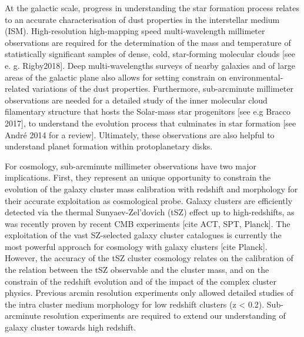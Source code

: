 
At the galactic scale, progress in understanding the star formation
process relates to an accurate characterisation of dust properties in
the interstellar medium (ISM). High-resolution high-mapping speed
multi-wavelength millimeter observations are required for the
determination of the mass and temperature of statistically significant
samples of dense, cold, star-forming molecular clouds
[see e. g. Rigby2018].
Deep multi-wavelengths surveys of nearby galaxies and of large areas
of the galactic plane also allows for setting constrain on
environmental-related variations of the dust properties.
Furthermore, sub-arcminute millimeter observations are needed for a
detailed study of the inner molecular cloud filamentary structure that
hosts the Solar-mass star progenitors [see e.g Bracco 2017], to
understand the evolution process that culminates in star
formation [see André 2014 for a review]. Ultimately, these
observations are also helpful to understand planet formation within
protoplanetary disks.


For cosmology, sub-arcminute millimeter observations have two major
implications. First, they represent an unique opportunity to constrain the
evolution of the galaxy cluster mass calibration with redshift and
morphology for their accurate exploitation as cosmological probe. 
Galaxy clusters are efficiently detected via the thermal
Sunyaev-Zel'dovich (tSZ) effect up to high-redshifts, as was recently
proven by recent CMB experiments [cite ACT, SPT, Planck]. The
exploitation of the vast SZ-selected galaxy cluster catalogues is
currently the most powerful approach for cosmology with galaxy
clusters [cite Planck]. However, the accuracy of the tSZ cluster
cosmology relates on the calibration of the relation between the tSZ
observable and the cluster mass, and on the constrain of the redshift
evolution and of the impact of the complex cluster physics. 
Previous arcmin resolution experiments only allowed detailed studies
of the intra cluster medium morphology for low redshift clusters (z <
0.2). Sub-arcminute resolution experiments are required to extend our
understanding of galaxy cluster towards high redshift.

